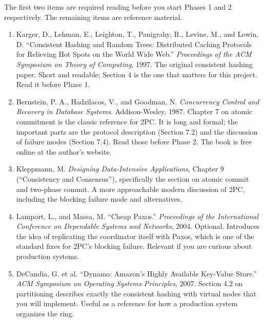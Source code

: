 \documentclass[11pt,a4paper]{article}
\begin{document}
The first two items are required reading before you start Phases 1 and 2 respectively. The remaining items are reference material.

\begin{enumerate}
\item Karger, D., Lehman, E., Leighton, T., Panigrahy, R., Levine, M., and Lewin, D. ``Consistent Hashing and Random Trees: Distributed Caching Protocols for Relieving Hot Spots on the World Wide Web.'' \textit{Proceedings of the ACM Symposium on Theory of Computing}, 1997. The original consistent hashing paper. Short and readable; Section 4 is the one that matters for this project. Read it before Phase 1.

\item Bernstein, P. A., Hadzilacos, V., and Goodman, N. \textit{Concurrency Control and Recovery in Database Systems}. Addison-Wesley, 1987. Chapter 7 on atomic commitment is the classic reference for 2PC. It is long and formal; the important parts are the protocol description (Section 7.2) and the discussion of failure modes (Section 7.4). Read those before Phase 2. The book is free online at the author's website.

\item Kleppmann, M. \textit{Designing Data-Intensive Applications}, Chapter 9 (``Consistency and Consensus''), specifically the section on atomic commit and two-phase commit. A more approachable modern discussion of 2PC, including the blocking failure mode and alternatives.

\item Lamport, L., and Massa, M. ``Cheap Paxos.'' \textit{Proceedings of the International Conference on Dependable Systems and Networks}, 2004. Optional. Introduces the idea of replicating the coordinator itself with Paxos, which is one of the standard fixes for 2PC's blocking failure. Relevant if you are curious about production systems.

\item DeCandia, G. et al. ``Dynamo: Amazon's Highly Available Key-Value Store.'' \textit{ACM Symposium on Operating Systems Principles}, 2007. Section 4.2 on partitioning describes exactly the consistent hashing with virtual nodes that you will implement. Useful as a reference for how a production system organizes the ring.
\end{enumerate}

\footerboxes
\end{document}
